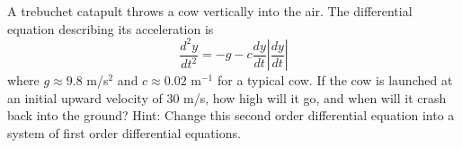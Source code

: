 % 


\begin{problem}
    A trebuchet catapult throws a cow vertically into the air.  The differential equation
    describing its acceleration is
    \[ \frac{d^2y}{dt^2} = -g - c \frac{dy}{dt} \left| \frac{dy}{dt} \right| \]
    where $g \approx 9.8$ m/s$^2$ and $c \approx 0.02$ m$^{-1}$ for a typical cow.  If the
    cow is launched at an initial upward velocity of 30 m/s, how high will it go, and when
    will it crash back into the ground? Hint: Change this second order differential
    equation into a system of first order differential equations.
\end{problem}



